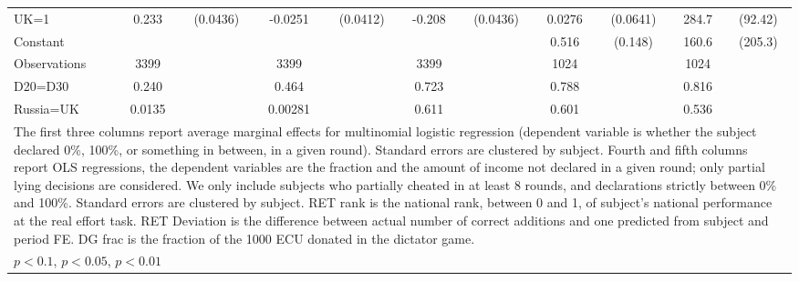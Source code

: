 \begin{tabular}{l|cccccc|cc|cc}
UK=1            &    0.233\sym{***}& (0.0436)&  -0.0251         & (0.0412)&   -0.208\sym{***}& (0.0436)&   0.0276         & (0.0641)&    284.7\sym{***}&  (92.42)\\
Constant        &                  &         &                  &         &                  &         &    0.516\sym{***}&  (0.148)&    160.6         &  (205.3)\\
\hline
Observations    &     3399         &         &     3399         &         &     3399         &         &     1024         &         &     1024         &         \\
D20=D30         &    0.240         &         &    0.464         &         &    0.723         &         &    0.788         &         &    0.816         &         \\
Russia=UK       &   0.0135         &         &  0.00281         &         &    0.611         &         &    0.601         &         &    0.536         &         \\
\hline\hline
\multicolumn{11}{p{18cm}}{\tiny The first three columns report average marginal effects for multinomial logistic regression (dependent variable is whether the subject declared 0\%, 100\%, or something in between, in a given round). Standard errors are clustered by subject. Fourth and fifth columns report OLS regressions, the dependent variables are the fraction and the amount of income not declared in a given round; only partial lying decisions are considered. We only include subjects who partially cheated in at least 8 rounds, and declarations strictly between 0\% and 100\%. Standard errors are clustered by subject. RET rank is the national rank, between 0 and 1, of subject's national performance at the real effort task. RET Deviation is the difference between actual number of correct additions and one predicted from subject and period FE. DG frac is the fraction of the 1000 ECU donated in the dictator game.}\\
\multicolumn{11}{l}{\tiny \sym{*} \(p<0.1\), \sym{**} \(p<0.05\), \sym{***} \(p<0.01\)}\\
\end{tabular}